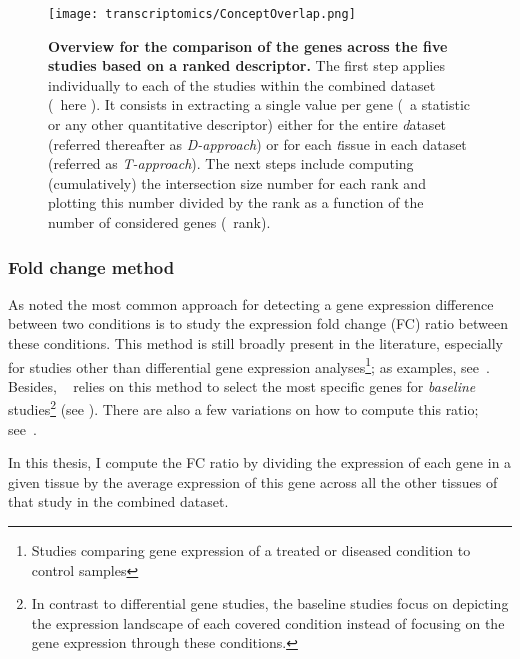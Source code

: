 \begin{figure}[!htb]
    \texttt{[image: transcriptomics/ConceptOverlap.png]}\centering
    \caption[Overview for the comparison of the genes across the five
    studies based on a ranked descriptor 5 studies]{\label{fig:overlapConcept}%
    \textbf{Overview for the comparison of the genes across the five
    studies based on a ranked descriptor.}
    The first step applies individually to each of the studies
    within the combined dataset (\ie\ here \setOne).
    It consists in extracting a single value per gene
    (\eg\ a statistic or any other quantitative descriptor)
    either for the entire \emph{d}ataset (referred thereafter as \emph{D-approach}) or
    for each \emph{t}issue in each dataset (referred as \emph{T-approach}).
    The next steps include
    computing (cumulatively) the intersection size number for each rank
    and plotting this number divided by the rank
    as a function of the number of considered genes (\ie\ rank).}
\end{figure}

\subsubsection{Fold change method}\label{subsub:TisSpeGeneMethodPerso}
As \citet{DESeq2} noted the most common approach for detecting
a gene expression difference between two conditions is
to study the expression fold change (FC) ratio between these conditions.
This method is still broadly present in the literature,
especially for studies other than differential gene expression analyses\footnote{%
Studies comparing gene expression of a treated or diseased condition
to control samples};
as examples, see~\citet{Uhlen2015,Zhu2016-xo,Yu2015-uh}.
Besides, \egxa\  relies on this method to select
the most specific genes for \emph{baseline} studies\footnote{In
contrast to differential gene studies,
the baseline studies focus on
depicting the expression landscape of each covered condition
instead of focusing on the gene expression through these conditions.}
(see ).
There are also a few variations
on how to compute this ratio; see~\citet{Zhu2016-xo,Uhlen2015}.\mybr\

In this thesis,
I compute the FC ratio by dividing the expression
of each gene in a given tissue
by the average expression of this gene across all the other tissues of that study
in the combined dataset.\mybr\

